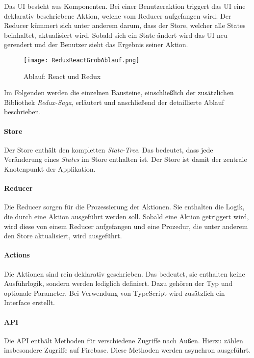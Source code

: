 Das UI besteht aus Komponenten. Bei einer Benutzeraktion
triggert das UI eine deklarativ beschriebene Aktion, welche vom Reducer aufgefangen wird.
Der Reducer kümmert sich unter anderem darum, dass der Store, welcher alle States beinhaltet, aktualisiert wird.
Sobald sich ein State ändert wird das UI neu gerendert und der Benutzer sieht das Ergebnis seiner Aktion.

\begin{figure}[h]
    \centering
    \texttt{[image: ReduxReactGrobAblauf.png]}
    \caption{Ablauf: React und Redux}
    \label{fig:ReduxReact}
\end{figure}

Im Folgenden werden die einzelnen Bausteine, einschließlich der zusätzlichen Bibliothek \textit{Redux-Saga}, erläutert und
anschließend der detaillierte Ablauf beschrieben.

\paragraph{Store}
Der Store enthält den kompletten \textit{State-Tree}. Das bedeutet, dass jede Veränderung
eines \textit{States} im Store enthalten ist. Der Store ist damit der zentrale Knotenpunkt der Applikation.

\paragraph{Reducer}
Die Reducer sorgen für die Prozessierung der Aktionen. Sie enthalten die Logik, die
durch eine Aktion ausgeführt werden soll. Sobald eine Aktion getriggert wird, wird diese von einem
Reducer aufgefangen und eine Prozedur, die unter anderem den Store aktualisiert, wird ausgeführt.

\paragraph{Actions}
Die Aktionen sind rein deklarativ geschrieben. Das bedeutet, sie enthalten keine Ausführlogik,
sondern werden lediglich definiert. Dazu gehören der Typ und optionale Parameter.
Bei Verwendung von TypeScript wird zusätzlich ein Interface erstellt.

\paragraph{API}
Die API enthält Methoden für verschiedene Zugriffe nach Außen.
Hierzu zählen insbesondere Zugriffe auf Firebase.
Diese Methoden werden asynchron ausgeführt.

